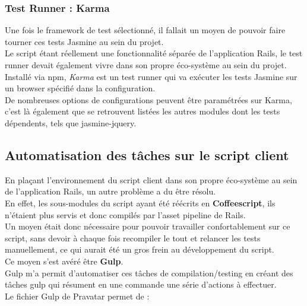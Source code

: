 \documentclass{report}
\begin{document}
        \subsubsection{Test Runner : Karma}
        \label{subs:Test Runner : Karma}

          Une fois le framework de test sélectionné, il fallait un moyen de pouvoir faire tourner ces tests Jasmine au sein du projet.\\

          Le script étant réellement une fonctionnalité séparée de l'application Rails, le test runner devait également vivre dans son propre éco-système au sein du projet.\\

          Installé via npm, \textit{Karma} est un test runner qui va exécuter les tests Jasmine sur un browser spécifié dans la configuration.\\
          De nombreuses options de configurations peuvent être paramétrées sur Karma, c'est là également que se retrouvent listées les autres modules dont les tests dépendents, tels que jasmine-jquery.\\

      \subsection{Automatisation des tâches sur le script client}
      \label{subs:Automatisation des tâches sur le script client}

        En plaçant l'environnement du script client dans son propre éco-système au sein de l'application Rails, un autre problème a du être résolu.\\

        En effet, les sous-modules du script ayant été réécrits en \textbf{Coffeescript}, ils n'étaient plus servis et donc compilés par l'asset pipeline de Rails.\\
        Un moyen était donc nécessaire pour pouvoir travailler confortablement sur ce script, sans devoir à chaque fois recompiler le tout et relancer les tests manuellement,
        ce qui aurait été un gros frein au développement du script.\\

        Ce moyen s'est avéré être \textbf{Gulp}.\\
        Gulp m'a permit d'automatiser ces tâches de compilation/testing en créant des tâches gulp qui résument en une commande une série d'actions à effectuer.\\
        Le fichier Gulp de Pravatar permet de :\\
\end{document}
